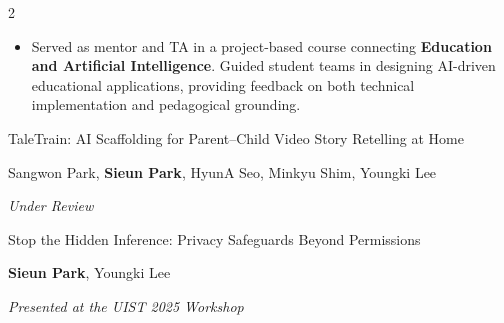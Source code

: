 \documentclass[10pt,a4paper,withhyper]{altacv}
\newcommand{\cvpub}[3]{%
  {\normalsize\color{accent} #1}\par
  \vspace{2pt}
  {\small #2}\par
  \vspace{2pt}
  {\small\itshape #3}\par
  \vspace{6pt}
}
\begin{document}
\begin{paracol}{2}

\begin{itemize}
  \item Served as mentor and TA in a project-based course connecting \textbf{Education and Artificial Intelligence}. Guided student teams in designing AI-driven educational applications, providing feedback on both technical implementation and pedagogical grounding.
\end{itemize}










\cvpub
{TaleTrain: AI Scaffolding for Parent--Child Video Story Retelling at Home}
{Sangwon Park, \textbf{Sieun Park}, HyunA Seo, Minkyu Shim, Youngki Lee}
{Under Review}

\divider

\cvpub
{Stop the Hidden Inference: Privacy Safeguards Beyond Permissions}
{\textbf{Sieun Park}, Youngki Lee}
{Presented at the UIST 2025 Workshop}


\end{paracol}
\end{document}
